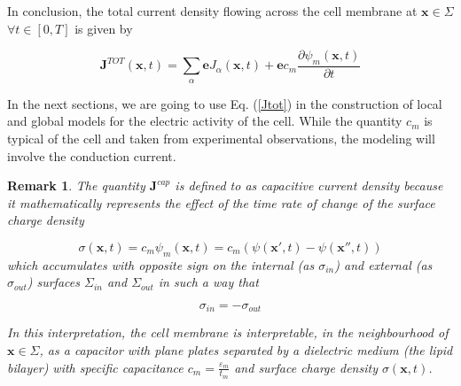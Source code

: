 \documentclass[12pt, a4paper]{article}
\newtheorem{remark}{Remark}
\begin{document}
In conclusion, the total current density flowing across the cell membrane at $ \textbf{x} \in \Sigma$ $\forall t \in [0,T]$ is given by

\begin{equation}
\textbf{J}^{TOT}(\textbf{x},t) = \sum_{\alpha} \textbf{e} J_{\alpha}(\textbf{x},t) + \textbf{e} c_m \frac{\partial \psi_m (\textbf{x},t)}{\partial t} \label{Jtot}
\end{equation}

In the next sections, we are going to use Eq. (\ref*{Jtot}) in the construction of local and global models for the electric activity of the cell. While the quantity $c_m$ is typical of the cell and taken from experimental observations, the modeling will involve the conduction current. 

\begin{remark}
	The quantity $\textbf{J}^{cap}$ is defined to as capacitive current density because it mathematically represents the effect of the time rate of change of the surface charge density 
	
	$$ \sigma(\textbf{x},t) = c_m \psi_m (\textbf{x},t) = c_m \left(\psi(\textbf{x}',t) - \psi(\textbf{x}'',t) \right)$$
	which accumulates with opposite sign on the internal (as $\sigma_{in}$) and external (as $\sigma_{out}$) surfaces $\Sigma_{in}$ and $\Sigma_{out}$ in such a way that
	
	$$ \sigma_{in} = -\sigma_{out} $$
	
	In this interpretation, the cell membrane is interpretable, in the neighbourhood of $ \textbf{x} \in \Sigma$, as a capacitor with plane plates separated by a dielectric medium (the lipid bilayer) with specific capacitance $ c_m = \frac{\varepsilon_m}{t_m}$ and surface charge density $\sigma(\textbf{x},t)$.
\end{remark}
\end{document}
